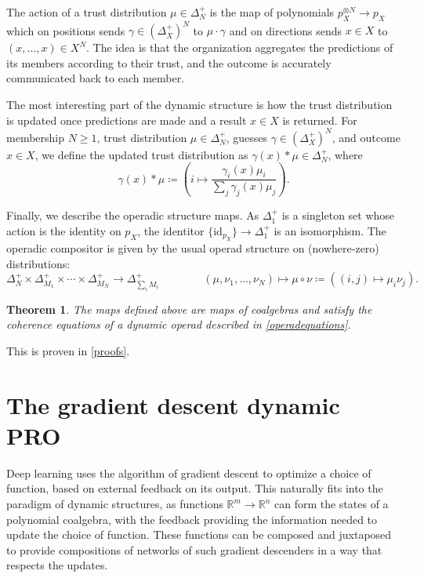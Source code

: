 \documentclass[11pt, one side, article]{memoir}
\theoremstyle{definition}
\theoremstyle{plain}
\newtheorem{theorem}[definitionx]{Theorem}
\newcommand{\id}{\mathrm{id}}
\newcommand{\rr}{\mathbb{R}}
\newcommand{\0}{\textsf{0}}
\newcommand{\1}{\tn{\textsf{1}}}
\newcommand{\bet}{\Delta^+}
\begin{document}
The action of a trust distribution $\mu \in \Delta^+_N$ is the map of polynomials $p_X^{\otimes N} \to p_X$ which on positions sends $\gamma \in (\bet_X)^N$ to $\mu \cdot \gamma$ and on directions sends $x \in X$ to $(x,...,x) \in X^N$. The idea is that the organization aggregates the predictions of its members according to their trust, and the outcome is accurately communicated back to each member.

The most interesting part of the dynamic structure is how the trust distribution is updated once predictions are made and a result $x\in X$ is returned. For membership $N\geq 1$, trust distribution $\mu\in\Delta^+_N$, guesses $\gamma\in(\bet_X)^N$, and outcome $x\in X$, we define the updated trust distribution as $\gamma(x) * \mu \in\Delta^+_N$, where
\[
\gamma(x) * \mu \coloneqq \left( i \mapsto \frac{\gamma_i(x)\mu_i}{\sum_j \gamma_j(x)\mu_j}\right).
\]

Finally, we describe the operadic structure maps. As $\Delta^+_1$ is a singleton set whose action is the identity on $p_X$, the identitor $\{\id_{p_X}\} \to \Delta^+_1$ is an isomorphism. The operadic compositor is given by the usual operad structure on (nowhere-zero) distributions:
\[
\Delta^+_N \times \Delta^+_{M_1} \times \cdots \times \Delta^+_{M_N} \to \Delta^+_{\sum_i M_i} \qquad\qquad (\mu,\nu_1,\ldots,\nu_N) \mapsto \mu \circ \nu \coloneqq \left( (i,j) \mapsto \mu_i\nu_j \right).
\]

\begin{theorem}\label{predictionadaptive}
The maps defined above are maps of coalgebras and satisfy the coherence equations of a dynamic operad described in \cref{operadequations}.
\end{theorem}

This is proven in \cref{proofs}.

\section{The gradient descent dynamic PRO}

Deep learning uses the algorithm of gradient descent to optimize a choice of function, based on external feedback on its output. This naturally fits into the paradigm of dynamic structures, as functions $\rr^m \to \rr^n$ can form the states of a polynomial coalgebra, with the feedback providing the information needed to update the choice of function. These functions can be composed and juxtaposed to provide compositions of networks of such gradient descenders in a way that respects the updates.
\end{document}
